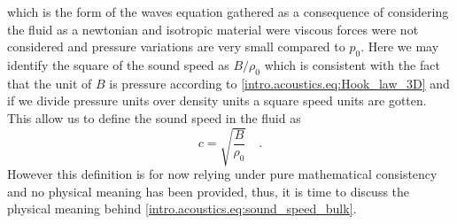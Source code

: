 which is the form of the waves equation gathered as a consequence of considering the fluid as a newtonian and isotropic material were viscous forces were not considered and pressure variations are very small compared to $p_0$. Here we may identify the square of the sound speed as $B/\rho_0$ which is consistent with the fact that the unit of $B$ is pressure according to \ref{intro.acoustics.eq:Hook_law_3D} and if we divide pressure units over density units a square speed units are gotten. This allow us to define the sound speed in the fluid as 
\begin{equation}\label{intro.acoustics.eq:sound_speed_bulk}
    c = \sqrt{\frac{B}{\rho_0}}\quad.
\end{equation}
However this definition is for now relying under pure mathematical consistency and no physical meaning has been provided, thus, it is time to discuss the physical meaning behind \ref{intro.acoustics.eq:sound_speed_bulk}. 

